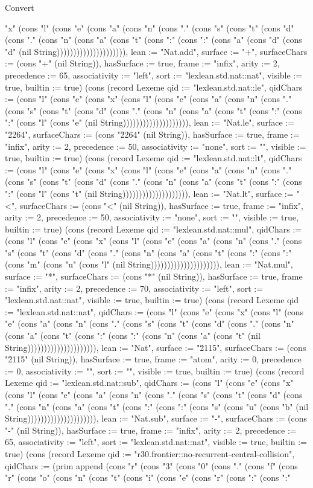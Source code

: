 \begin{lexlean}{Convert}
\begin{semanticmodule}
{"x" (cons "l" (cons "e" (cons "a" (cons "n" (cons "." (cons "s" (cons "t" (cons "d" (cons "." (cons "n" (cons "a" (cons "t" (cons ":" (cons ":" (cons "a" (cons "d" (cons "d" (nil String))))))))))))))))))))), lean := "Nat.add", surface := "+", surfaceChars := (cons "+" (nil String)), hasSurface := true, frame := "infix", arity := 2, precedence := 65, associativity := "left", sort := "lexlean.std.nat::nat", visible := true, builtin := true}) (cons (record Lexeme {qid := "lexlean.std.nat::le", qidChars := (cons "l" (cons "e" (cons "x" (cons "l" (cons "e" (cons "a" (cons "n" (cons "." (cons "s" (cons "t" (cons "d" (cons "." (cons "n" (cons "a" (cons "t" (cons ":" (cons ":" (cons "l" (cons "e" (nil String)))))))))))))))))))), lean := "Nat.le", surface := "\u2264", surfaceChars := (cons "\u2264" (nil String)), hasSurface := true, frame := "infix", arity := 2, precedence := 50, associativity := "none", sort := "", visible := true, builtin := true}) (cons (record Lexeme {qid := "lexlean.std.nat::lt", qidChars := (cons "l" (cons "e" (cons "x" (cons "l" (cons "e" (cons "a" (cons "n" (cons "." (cons "s" (cons "t" (cons "d" (cons "." (cons "n" (cons "a" (cons "t" (cons ":" (cons ":" (cons "l" (cons "t" (nil String)))))))))))))))))))), lean := "Nat.lt", surface := "<", surfaceChars := (cons "<" (nil String)), hasSurface := true, frame := "infix", arity := 2, precedence := 50, associativity := "none", sort := "", visible := true, builtin := true}) (cons (record Lexeme {qid := "lexlean.std.nat::mul", qidChars := (cons "l" (cons "e" (cons "x" (cons "l" (cons "e" (cons "a" (cons "n" (cons "." (cons "s" (cons "t" (cons "d" (cons "." (cons "n" (cons "a" (cons "t" (cons ":" (cons ":" (cons "m" (cons "u" (cons "l" (nil String))))))))))))))))))))), lean := "Nat.mul", surface := "*", surfaceChars := (cons "*" (nil String)), hasSurface := true, frame := "infix", arity := 2, precedence := 70, associativity := "left", sort := "lexlean.std.nat::nat", visible := true, builtin := true}) (cons (record Lexeme {qid := "lexlean.std.nat::nat", qidChars := (cons "l" (cons "e" (cons "x" (cons "l" (cons "e" (cons "a" (cons "n" (cons "." (cons "s" (cons "t" (cons "d" (cons "." (cons "n" (cons "a" (cons "t" (cons ":" (cons ":" (cons "n" (cons "a" (cons "t" (nil String))))))))))))))))))))), lean := "Nat", surface := "\u2115", surfaceChars := (cons "\u2115" (nil String)), hasSurface := true, frame := "atom", arity := 0, precedence := 0, associativity := "", sort := "", visible := true, builtin := true}) (cons (record Lexeme {qid := "lexlean.std.nat::sub", qidChars := (cons "l" (cons "e" (cons "x" (cons "l" (cons "e" (cons "a" (cons "n" (cons "." (cons "s" (cons "t" (cons "d" (cons "." (cons "n" (cons "a" (cons "t" (cons ":" (cons ":" (cons "s" (cons "u" (cons "b" (nil String))))))))))))))))))))), lean := "Nat.sub", surface := "-", surfaceChars := (cons "-" (nil String)), hasSurface := true, frame := "infix", arity := 2, precedence := 65, associativity := "left", sort := "lexlean.std.nat::nat", visible := true, builtin := true}) (cons (record Lexeme {qid := "r30.frontier::no-recurrent-central-collision", qidChars := (prim append (cons "r" (cons "3" (cons "0" (cons "." (cons "f" (cons "r" (cons "o" (cons "n" (cons "t" (cons "i" (cons "e" (cons "r" (cons ":" (cons ":" }
\end{semanticmodule}
\end{lexlean}
